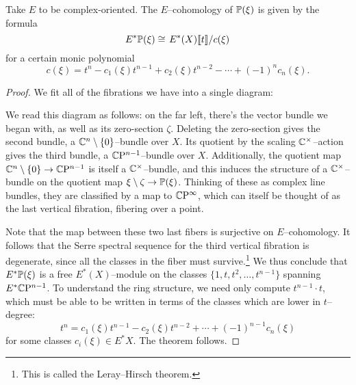 \begin{theorem}\label{CohomologyOfProjectivization}
Take $E$ to be complex-oriented.  The $E$--cohomology of $\P(\xi)$ is given by the formula \[E^* \P(\xi) \cong \left. E^*(X) \llbracket t \rrbracket \middle/ c(\xi) \right.\] for a certain monic polynomial \[c(\xi) = t^n - c_1(\xi) t^{n-1} + c_2(\xi) t^{n-2} - \cdots + (-1)^n c_n(\xi).\]
\end{theorem}
\begin{proof}
We fit all of the fibrations we have into a single diagram:
\begin{center}
\end{center}
We read this diagram as follows: on the far left, there's the vector bundle we began with, as well as its zero-section $\zeta$.  Deleting the zero-section gives the second bundle, a $\C^n \setminus \{0\}$--bundle over $X$.  Its quotient by the scaling $\C^\times$--action gives the third bundle, a $\CP^{n-1}$--bundle over $X$.  Additionally, the quotient map $\C^n \setminus \{0\} \to \CP^{n-1}$ is itself a $\C^\times$--bundle, and this induces the structure of a $\C^\times$--bundle on the quotient map $\xi \setminus \zeta \to \P(\xi)$.  Thinking of these as complex line bundles, they are classified by a map to $\CP^\infty$, which can itself be thought of as the last vertical fibration, fibering over a point.

Note that the map between these two last fibers is surjective on $E$--cohomology.  It follows that the Serre spectral sequence for the third vertical fibration is degenerate, since all the classes in the fiber must survive.\footnote{This is called the Leray--Hirsch theorem.}  We thus conclude that $E^* \P(\xi)$ is a free $E^*(X)$--module on the classes $\{1, t, t^2, \ldots, t^{n-1}\}$ spanning $E^* \CP^{n-1}$.  To understand the ring structure, we need only compute $t^{n-1} \cdot t$, which must be able to be written in terms of the classes which are lower in $t$--degree: \[t^n = c_1(\xi) t^{n-1} - c_2(\xi) t^{n-2} + \cdots + (-1)^{n-1} c_n(\xi)\] for some classes $c_i(\xi) \in E^* X$.  The theorem follows.
\end{proof}

